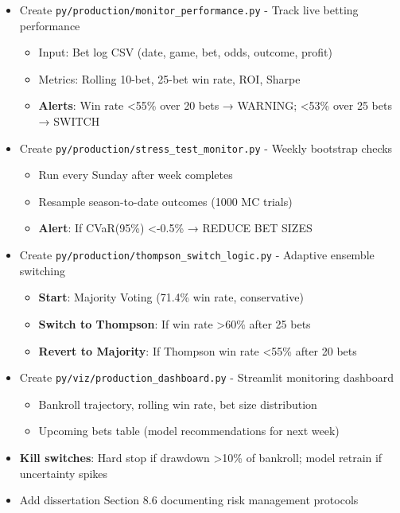 \begin{itemize}
  \item {} Create \texttt{py/production/monitor\_performance.py} - Track live betting performance
  \begin{itemize}
    \item Input: Bet log CSV (date, game, bet, odds, outcome, profit)
    \item Metrics: Rolling 10-bet, 25-bet win rate, ROI, Sharpe
    \item \textbf{Alerts}: Win rate <55\% over 20 bets → WARNING; <53\% over 25 bets → SWITCH
  \end{itemize}
  \item {} Create \texttt{py/production/stress\_test\_monitor.py} - Weekly bootstrap checks
  \begin{itemize}
    \item Run every Sunday after week completes
    \item Resample season-to-date outcomes (1000 MC trials)
    \item \textbf{Alert}: If CVaR(95\%) <-0.5\% → REDUCE BET SIZES
  \end{itemize}
  \item {} Create \texttt{py/production/thompson\_switch\_logic.py} - Adaptive ensemble switching
  \begin{itemize}
    \item \textbf{Start}: Majority Voting (71.4\% win rate, conservative)
    \item \textbf{Switch to Thompson}: If win rate >60\% after 25 bets
    \item \textbf{Revert to Majority}: If Thompson win rate <55\% after 20 bets
  \end{itemize}
  \item {} Create \texttt{py/viz/production\_dashboard.py} - Streamlit monitoring dashboard
  \begin{itemize}
    \item Bankroll trajectory, rolling win rate, bet size distribution
    \item Upcoming bets table (model recommendations for next week)
  \end{itemize}
  \item {} \textbf{Kill switches}: Hard stop if drawdown >10\% of bankroll; model retrain if uncertainty spikes
  \item {} Add dissertation Section 8.6 documenting risk management protocols
\end{itemize}

